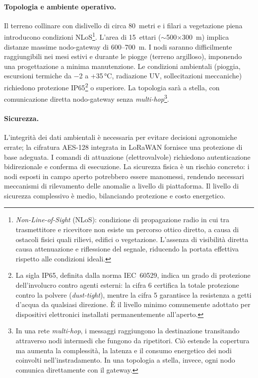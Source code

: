 \paragraph{Topologia e ambiente operativo.} Il terreno collinare con dislivello di circa 80~metri e i filari a vegetazione piena introducono condizioni NLoS\footnote{\textit{Non-Line-of-Sight} (NLoS): condizione di propagazione radio in cui tra trasmettitore e ricevitore non esiste un percorso ottico diretto, a causa di ostacoli fisici quali rilievi, edifici o vegetazione. L'assenza di visibilità diretta causa attenuazione e riflessione del segnale, riducendo la portata effettiva rispetto alle condizioni ideali.}. L'area di 15~ettari ($\sim$500$\times$300~m) implica distanze massime nodo-gateway di 600--700~m. I nodi saranno difficilmente raggiungibili nei mesi estivi e durante le piogge (terreno argilloso), imponendo una progettazione a minima manutenzione. Le condizioni ambientali (pioggia, escursioni termiche da $-$2 a +35\,°C, radiazione UV, sollecitazioni meccaniche) richiedono protezione IP65\footnote{La sigla IP65, definita dalla norma IEC~60529, indica un grado di protezione dell'involucro contro agenti esterni: la cifra 6 certifica la totale protezione contro la polvere (\textit{dust-tight}), mentre la cifra 5 garantisce la resistenza a getti d'acqua da qualsiasi direzione. È il livello minimo comunemente adottato per dispositivi elettronici installati permanentemente all'aperto.} o superiore. La topologia sarà a stella, con comunicazione diretta nodo-gateway senza \textit{multi-hop}\footnote{In una rete \textit{multi-hop}, i messaggi raggiungono la destinazione transitando attraverso nodi intermedi che fungono da ripetitori. Ciò estende la copertura ma aumenta la complessità, la latenza e il consumo energetico dei nodi coinvolti nell'instradamento. In una topologia a stella, invece, ogni nodo comunica direttamente con il gateway.}.

\paragraph{Sicurezza.} L'integrità dei dati ambientali è necessaria per evitare decisioni agronomiche errate; la cifratura AES-128 integrata in LoRaWAN fornisce una protezione di base adeguata. I comandi di attuazione (elettrovalvole) richiedono autenticazione bidirezionale e conferma di esecuzione. La sicurezza fisica è un rischio concreto: i nodi esposti in campo aperto potrebbero essere manomessi, rendendo necessari meccanismi di rilevamento delle anomalie a livello di piattaforma. Il livello di sicurezza complessivo è medio, bilanciando protezione e costo energetico.

